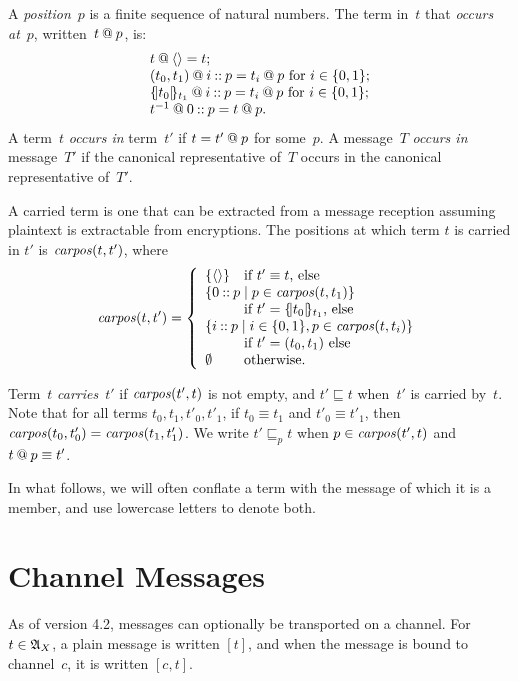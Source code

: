 \documentclass[12pt]{report}
\theoremstyle{definition}
\newcommand{\alga}{\alg{A}}
\newcommand{\carpos}{\fn{carpos}}
\begin{document}
A \emph{position}~$p$ is a finite sequence of natural
numbers.  The term in~$t$ that \emph{occurs at}~$p$, written~$t\mathbin{@}
p$, is:
$$\begin{array}{l}
t\mathbin{@}\langle\rangle=t;\\
(t_0,t_1)\mathbin{@} i\mathbin{::} p=t_i\mathbin{@} p\mbox{ for $i\in\{0,1\}$};\\
\{\!|t_0|\!\}_{t_1}\mathbin{@} i\mathbin{::} p=t_i\mathbin{@} p\mbox{ for
  $i\in\{0,1\}$};\\
t^{-1}\mathbin{@} 0\mathbin{::} p=t\mathbin{@} p.
\end{array}$$
A term~$t$ \emph{occurs in} term~$t'$ if $t=t'\mathbin{@}
p$ for some~$p$.  A message~$T$ \emph{occurs in} message~$T'$ if the
canonical representative of~$T$ occurs in the canonical representative
of~$T'$.

A carried term is one that can be extracted from a message reception
assuming plaintext is extractable from encryptions.  The positions at
which term $t$ is carried in $t'$ is $\carpos(t,t')$\index{carpos@\carpos}\label{def:carried positions},
where
$$\carpos(t,t')=\left\{
\begin{array}{ll}
\{\seq{}\}&\mbox{if $t'\equiv t$, else}\\
\multicolumn{2}{l}{\{0\cons p \mid
p\in\carpos(t,t_1)\}}\\
& \mbox{if $t'=\enc{t_0}{t_1}$, else}\\
\multicolumn{2}{l}{\{i\cons p \mid
i\in\{0,1\}, p\in\carpos(t,t_i)\}} \\
& \mbox{if $t'=(t_0,t_1)$ else}\\
\emptyset&\mbox{otherwise.}
\end{array}\right.$$

Term~$t$ \emph{carries}~$t'$ if $\carpos(t',t)$ is not
empty, and $t'\sqsubseteq t$ when~$t'$ is carried by~$t$.  Note that
for all terms $t_0,t_1,t'_0,t'_1$, if $t_0\equiv t_1$ and $t'_0\equiv
t'_1$, then $\carpos(t_0,t'_0)= \carpos(t_1,t'_1)$.  We write $t'
\sqsubseteq_p t$ when $p \in \carpos(t',t)$ and $t \mathbin{@} p \equiv
t'$.

In what follows, we will often conflate a term with the message of
which it is a member, and use lowercase letters to denote both.

\section{Channel Messages}

As of {\cpsa} version 4.2, messages can optionally be transported on a
channel.  For $t\in\alga_X$, a plain message is written $[t]$, and
when the message is bound to channel~$c$, it is written $[c,t]$.
\end{document}
